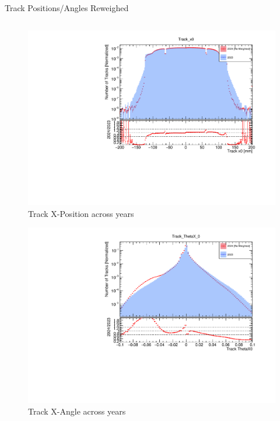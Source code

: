 \begin{frame}{Track Positions/Angles Reweighed}
    \begin{columns}
        \begin{column}{0.5\linewidth}
            \vspace{-0.4cm}
            \begin{figure}
                \includegraphics[width=\linewidth]{./ReweighedPlots/Track_x0_Reweighted.pdf}
                \caption{Track X-Position across years}
            \end{figure}
            \vspace{-0.9cm}
            \begin{figure}
                \includegraphics[width=\linewidth]{./ReweighedPlots/Track_ThetaX_0_Reweighted.pdf}
                \caption{Track X-Angle across years}

\end{figure}
\end{column}
\end{columns}
\end{frame}
